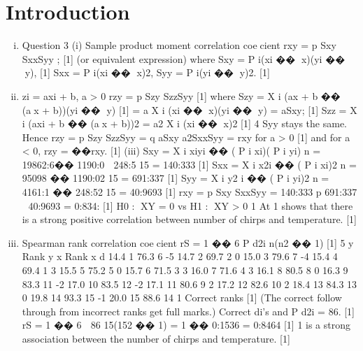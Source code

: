\documentclass{article}
\author{kobriendublin }
\date{December 2018}
\begin{document}
\section{Introduction}
\begin{enumerate}[(i)]
\item Question 3 (i) Sample product moment correlation coecient
rxy =
p Sxy
SxxSyy
; [1]
(or equivalent expression) where Sxy =
P
i(xi �� x)(yi �� y), [1]
Sxx =
P
i(xi �� x)2, Syy =
P
i(yi �� y)2. [1]
\item  zi = axi + b, a > 0
rzy =
p Szy
SzzSyy
[1]
where
Szy =
X
i
(ax + b �� (ax + b))(yi �� y) [1]
= a
X
i
(xi �� x)(yi �� y)
= aSxy; [1]
Szz =
X
i
(axi + b �� (ax + b))2
= a2
X
i
(xi �� x)2 [1]
4
Syy stays the same.
Hence
rzy =
p Szy
SzzSyy
=
q aSxy
a2SxxSyy
= rxy for a > 0 [1]
and for a < 0, rzy = ��rxy. [1]
(iii)
Sxy =
X
i
xiyi ��
(
P
i xi)(
P
i yi)
n
= 19862:6��
1190:0  248:5
15
= 140:333 [1]
Sxx =
X
i
x2i
��
(
P
i xi)2
n
= 95098 ��
1190:02
15
= 691:337 [1]
Syy =
X
i
y2
i ��
(
P
i yi)2
n
= 4161:1 ��
248:52
15
= 40:9693 [1]
rxy =
p Sxy
SxxSyy
=
140:333
p
691:337  40:9693
= 0:834: [1]
H0 : XY = 0 vs H1 : XY > 0
1%
At 1%
shows that there is a strong positive correlation between number of
chirps and temperature. [1]
\item  Spearman rank correlation coecient
rS = 1 ��
6
P
d2i
n(n2 �� 1)
[1]
5
y Rank y x Rank x d
14.4 1 76.3 6 -5
14.7 2 69.7 2 0
15.0 3 79.6 7 -4
15.4 4 69.4 1 3
15.5 5 75.2 5 0
15.7 6 71.5 3 3
16.0 7 71.6 4 3
16.1 8 80.5 8 0
16.3 9 83.3 11 -2
17.0 10 83.5 12 -2
17.1 11 80.6 9 2
17.2 12 82.6 10 2
18.4 13 84.3 13 0
19.8 14 93.3 15 -1
20.0 15 88.6 14 1
Correct ranks [1]
(The correct follow through from incorrect ranks get full marks.)
Correct di's and
P
d2i
= 86. [1]
rS = 1 ��
6  86
15(152 �� 1)
= 1 �� 0:1536 = 0:8464 [1]
1%
is a strong association between the number of chirps and temperature. [1]
\end{enumerate}
\end{document}
